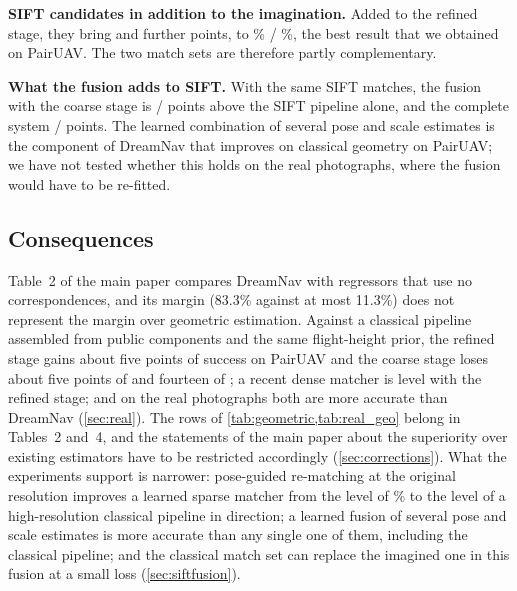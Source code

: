 \noindent\textbf{SIFT candidates in addition to the imagination.} Added to the refined stage, they bring \sfuAddRefSRd{} \ci{\sfuAddRefSRdLo}{\sfuAddRefSRdHi} and \sfuAddRefSRe{} \ci{\sfuAddRefSReLo}{\sfuAddRefSReHi} further points, to \sfuRefSiftSRd\% / \sfuRefSiftSRe\%, the best result that we obtained on PairUAV. The two match sets are therefore partly complementary.

\noindent\textbf{What the fusion adds to SIFT.} With the same SIFT matches, the fusion with the coarse stage is \sfuCoarseSiftVsSiftSRd{} \ci{\sfuCoarseSiftVsSiftSRdLo}{\sfuCoarseSiftVsSiftSRdHi} / \sfuCoarseSiftVsSiftSRe{} \ci{\sfuCoarseSiftVsSiftSReLo}{\sfuCoarseSiftVsSiftSReHi} points above the SIFT pipeline alone, and the complete system \sfuAllVsSiftSRd{} / \sfuAllVsSiftSRe{} points. The learned combination of several pose and scale estimates is the component of DreamNav that improves on classical geometry on PairUAV; we have not tested whether this holds on the real photographs, where the fusion would have to be re-fitted.

\subsection{Consequences}
\label{sec:geoconsequences}

Table~2 of the main paper compares DreamNav with regressors that use no correspondences, and its margin (83.3\% \SRd{} against at most 11.3\%) does not represent the margin over geometric estimation. Against a classical pipeline assembled from public components and the same flight-height prior, the refined stage gains about five points of success on PairUAV and the coarse stage loses about five points of \SRd{} and fourteen of \SRe; a recent dense matcher is level with the refined stage; and on the real photographs both are more accurate than DreamNav (\cref{sec:real}). The rows of \cref{tab:geometric,tab:real_geo} belong in Tables~2 and~4, and the statements of the main paper about the superiority over existing estimators have to be restricted accordingly (\cref{sec:corrections}). What the experiments support is narrower: pose-guided re-matching at the original resolution improves a learned sparse matcher from the level of \gbSgRotSRd\% to the level of a high-resolution classical pipeline in direction; a learned fusion of several pose and scale estimates is more accurate than any single one of them, including the classical pipeline; and the classical match set can replace the imagined one in this fusion at a small loss (\cref{sec:siftfusion}).
